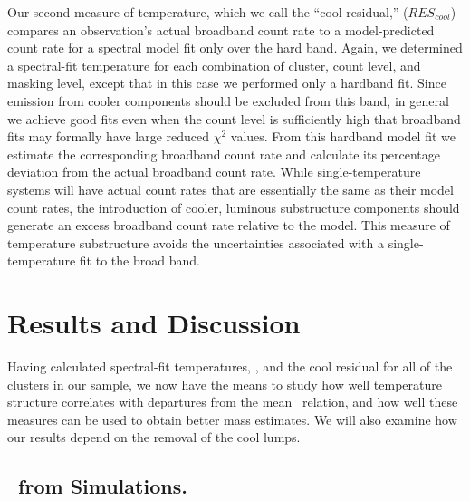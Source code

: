 \documentclass[12pt,preprint]{aastex}
\begin{document}
Our second measure of temperature, which we call the ``cool
residual,'' ($RES_{cool}$) compares an observation's actual broadband
count rate to a model-predicted count rate for a spectral model fit
only over the hard band.  Again, we determined a spectral-fit
temperature for each combination of cluster, count level, and masking
level, except that in this case we performed only a hardband fit.
Since emission from cooler components should be excluded from this
band, in general we achieve good fits even when the count level is
sufficiently high that broadband fits may formally have large reduced
$\chi^2$ values.  From this hardband model fit we estimate the
corresponding broadband count rate and calculate its percentage
deviation from the actual broadband count rate.  While
single-temperature systems will have actual count rates that are
essentially the same as their model count rates, the introduction of
cooler, luminous substructure components should generate an excess
broadband count rate relative to the model.  This measure of
temperature substructure avoids the uncertainties associated with a
single-temperature fit to the broad band.

\section{Results and Discussion}
\label{sec:results}

Having calculated spectral-fit temperatures, \thbr, and the cool
residual for all of the clusters in our sample, we now have the means
to study how well temperature structure correlates with departures
from the mean \mtx\ relation, and how well these measures can be used
to obtain better mass estimates.  We will also examine how our results
depend on the removal of the cool lumps.

\subsection{\thbr\ from Simulations.}
\end{document}
